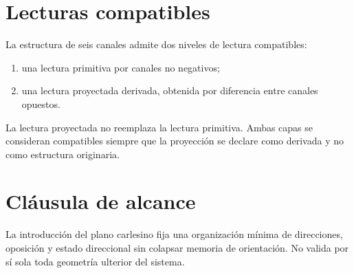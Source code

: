 \section{Lecturas compatibles}
\begin{definition}
La estructura de seis canales admite dos niveles de lectura compatibles:
\begin{enumerate}
  \item una lectura primitiva por canales no negativos;
  \item una lectura proyectada derivada, obtenida por diferencia entre canales opuestos.
\end{enumerate}
\end{definition}

\begin{observation}
La lectura proyectada no reemplaza la lectura primitiva. Ambas capas se consideran compatibles siempre que la proyección se declare como derivada y no como estructura originaria.
\end{observation}

\section{Cláusula de alcance}
\begin{observation}
La introducción del plano carlesino fija una organización mínima de direcciones, oposición y estado direccional sin colapsar memoria de orientación. No valida por sí sola toda geometría ulterior del sistema.
\end{observation}

